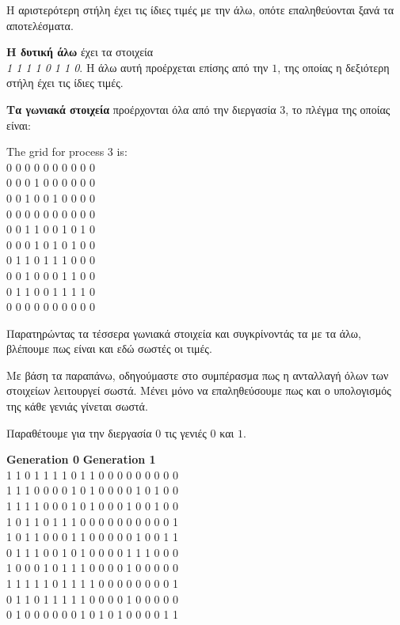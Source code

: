 \begin{multicols}{2}
Η αριστερότερη στήλη έχει τις ίδιες τιμές με την άλω, οπότε επαληθεύονται ξανά τα αποτελέσματα. \par

\textbf{Η δυτική άλω} έχει τα στοιχεία \\ \emph{1 1 1 1 0 1 1 0}. Η άλω αυτή προέρχεται επίσης από την $1$, της οποίας η δεξιότερη στήλη έχει τις ίδιες τιμές. \par
\textbf{Τα γωνιακά στοιχεία} προέρχονται όλα από την διεργασία $3$, το πλέγμα της οποίας είναι:

\begin{tcolorbox}
The grid for process 3 is: \\
0 0 0 0 0 0 0 0 0 0 \\
0 0 0 1 0 0 0 0 0 0 \\
0 0 1 0 0 1 0 0 0 0 \\
0 0 0 0 0 0 0 0 0 0 \\
0 0 1 1 0 0 1 0 1 0 \\
0 0 0 1 0 1 0 1 0 0 \\
0 1 1 0 1 1 1 0 0 0 \\
0 0 1 0 0 0 1 1 0 0 \\
0 1 1 0 0 1 1 1 1 0 \\
0 0 0 0 0 0 0 0 0 0 \\
\end{tcolorbox}
Παρατηρώντας τα τέσσερα γωνιακά στοιχεία και συγκρίνοντάς τα με τα άλω, βλέπουμε πως είναι και εδώ σωστές οι τιμές. \par
Με βάση τα παραπάνω, οδηγούμαστε στο συμπέρασμα πως η ανταλλαγή όλων των στοιχείων λειτουργεί σωστά. Μένει μόνο να επαληθεύσουμε πως και ο υπολογισμός της κάθε γενιάς γίνεται σωστά. \par
Παραθέτουμε για την διεργασία $0$ τις γενιές $0$ και $1$.

\begin{tcolorbox}[left=2pt,right=2pt]
\centering
\textbf{Generation 0} \quad \textbf{Generation 1} \\
1 1 0 1 1 1 1 0 1 1  0 0 0 0 0 0 0 0 0 \\
1 1 1 0 0 0 0 1 0 1  0 0 0 0 1 0 1 0 0 \\
1 1 1 1 0 0 0 1 0 1  0 0 0 1 0 0 1 0 0 \\
1 0 1 1 0 1 1 1 0 0  0 0 0 0 0 0 0 0 1 \\
1 0 1 1 0 0 0 1 1 0  0 0 0 0 1 0 0 1 1 \\
0 1 1 1 0 0 1 0 1 0  0 0 0 1 1 1 0 0 0 \\
1 0 0 0 1 0 1 1 1 0  0 0 0 1 0 0 0 0 0 \\
1 1 1 1 1 0 1 1 1 1  0 0 0 0 0 0 0 0 1 \\
0 1 1 0 1 1 1 1 1 0  0 0 0 1 0 0 0 0 0 \\
0 1 0 0 0 0 0 0 1 0  1 0 1 0 0 0 0 1 1 \\
\end{tcolorbox}


\end{multicols}
